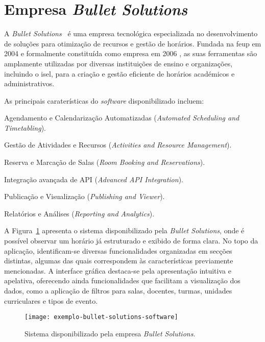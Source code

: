 \section{Empresa \textit{Bullet Solutions}}
\label{capitulo2:Bullet-Solutions}

A \textit{Bullet Solutions}~\cite{bulletsolutions-Website} é uma empresa tecnológica especializada no desenvolvimento de soluções para otimização de recursos e gestão de horários. Fundada na \gls{feup} em 2004 e formalmente constituída como empresa em 2006 \cite{bulletsolutions-foundation-information}, as suas ferramentas são amplamente utilizadas por diversas instituições de ensino e organizações, incluindo o \gls{isel}, para a criação e gestão eficiente de horários académicos e administrativos.

As principais caraterísticas do \textit{software} disponibilizado incluem:

\begin{compactitem}
    \item Agendamento e Calendarização Automatizadas (\textit{Automated Scheduling and Timetabling}).
    \item Gestão de Atividades e Recursos (\textit{Activities and Resource Management}).
    \item Reserva e Marcação de Salas (\textit{Room Booking and Reservations}).
    \item Integração avançada de API (\textit{Advanced API Integration}).
    \item Publicação e Visualização (\textit{Publishing and Viewer}).
    \item Relatórios e Análises (\textit{Reporting and Analytics}).
\end{compactitem}

A Figura~\ref{fig:software-bullet-solutions} apresenta o sistema disponibilizado pela \textit{Bullet Solutions}, onde é possível observar um horário já estruturado e exibido de forma clara. No topo da aplicação, identificam-se diversas funcionalidades organizadas em secções distintas, algumas das quais correspondem às características previamente mencionadas. A interface gráfica destaca-se pela apresentação intuitiva e apelativa, oferecendo ainda funcionalidades que facilitam a visualização dos dados, como a aplicação de filtros para salas, docentes, turmas, unidades curriculares e tipos de evento.

\begin{figure}[H]
    \centering
    \texttt{[image: exemplo-bullet-solutions-software]}
    \caption{Sistema disponibilizado pela empresa \textit{Bullet Solutions}.}
    \label{fig:software-bullet-solutions}
\end{figure}

